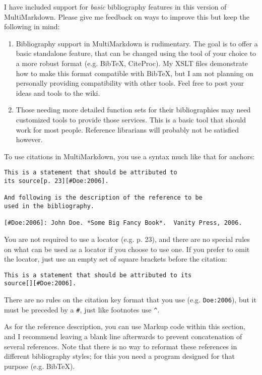 I have included support for \emph{basic} bibliography features in this version of MultiMarkdown. Please give me feedback on ways to improve this but keep the following in mind:

\begin{enumerate}
\item Bibliography support in MultiMarkdown is rudimentary. The goal is to offer a basic standalone feature, that can be changed using the tool of your choice to a more robust format (e.g. BibTeX, CiteProc). My XSLT files demonstrate how to make this format compatible with BibTeX, but I am not planning on personally providing compatibility with other tools. Feel free to post your ideas and tools to the wiki.

\item Those needing more detailed function sets for their bibliographies may need customized tools to provide those services. This is a basic tool that should work for most people. Reference librarians will probably not be satisfied however.

\end{enumerate}

To use citations in MultiMarkdown, you use a syntax much like that for anchors:

\begin{verbatim}
This is a statement that should be attributed to
its source[p. 23][#Doe:2006].

And following is the description of the reference to be
used in the bibliography.

[#Doe:2006]: John Doe. *Some Big Fancy Book*.  Vanity Press, 2006.
\end{verbatim}

You are not required to use a locator (e.g. p. 23), and there are no special rules on what can be used as a locator if you choose to use one. If you prefer to omit the locator, just use an empty set of square brackets before the citation:

\begin{verbatim}
This is a statement that should be attributed to its 
source[][#Doe:2006].
\end{verbatim}

There are no rules on the citation key format that you use (e.g. \texttt{Doe:2006}), but it must be preceded by a \texttt{\#}, just like footnotes use \texttt{\^{}}.

As for the reference description, you can use Markup code within this section, and I recommend leaving a blank line afterwards to prevent concatenation of several references. Note that there is no way to reformat these references in different bibliography styles; for this you need a program designed for that purpose (e.g. BibTeX).

